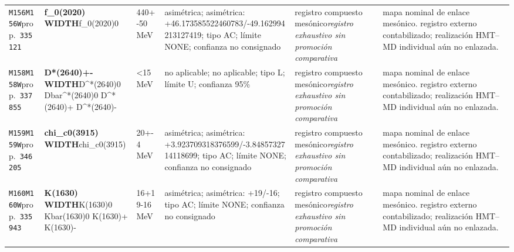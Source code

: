 \begin{landscape}
\begin{longtable}{L{1.85cm}L{4.45cm}L{2.35cm}L{4.05cm}L{3.35cm}L{7.15cm}}
\texttt{M156}\newline \texttt{M156W}\newline prop.\ \texttt{335121} & \textbf{f\_\allowbreak{}0(2020) WIDTH}\newline f\_\allowbreak{}0(2020)0 & 440+-50\,MeV & asimétrica; asimétrica: +46.173585522460783/-49.162994213127419; tipo AC; límite NONE; confianza no consignado & registro compuesto mesónico\newline \emph{registro exhaustivo sin promoción comparativa} & mapa nominal de enlace mesónico. registro externo contabilizado; realización HMT--MD individual aún no enlazada. \\
\texttt{M158}\newline \texttt{M158W}\newline prop.\ \texttt{337855} & \textbf{D*(2640)+- WIDTH}\newline D\textasciicircum{}*(2640)0 \textbar{}\allowbreak{} Dbar\textasciicircum{}*(2640)0 \textbar{}\allowbreak{} D\textasciicircum{}*(2640)+ \textbar{}\allowbreak{} D\textasciicircum{}*(2640)- & \textless{}15\,MeV & no aplicable; no aplicable; tipo L; límite U; confianza 95\% & registro compuesto mesónico\newline \emph{registro exhaustivo sin promoción comparativa} & mapa nominal de enlace mesónico. registro externo contabilizado; realización HMT--MD individual aún no enlazada. \\
\texttt{M159}\newline \texttt{M159W}\newline prop.\ \texttt{346205} & \textbf{chi\_\allowbreak{}c0(3915) WIDTH}\newline chi\_\allowbreak{}c0(3915) & 20+-4\,MeV & asimétrica; asimétrica: +3.923709318376599/-3.8485732714118699; tipo AC; límite NONE; confianza no consignado & registro compuesto mesónico\newline \emph{registro exhaustivo sin promoción comparativa} & mapa nominal de enlace mesónico. registro externo contabilizado; realización HMT--MD individual aún no enlazada. \\
\texttt{M160}\newline \texttt{M160W}\newline prop.\ \texttt{335943} & \textbf{K(1630) WIDTH}\newline K(1630)0 \textbar{}\allowbreak{} Kbar(1630)0 \textbar{}\allowbreak{} K(1630)+ \textbar{}\allowbreak{} K(1630)- & 16+19-16\,MeV & asimétrica; asimétrica: +19/-16; tipo AC; límite NONE; confianza no consignado & registro compuesto mesónico\newline \emph{registro exhaustivo sin promoción comparativa} & mapa nominal de enlace mesónico. registro externo contabilizado; realización HMT--MD individual aún no enlazada. \\

\end{longtable}
\end{landscape}
